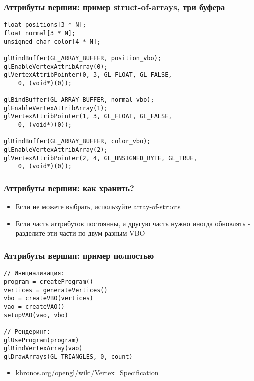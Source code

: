 \documentclass{beamer}
\begin{document}
\begin{frame}[fragile]
\frametitle{Аттрибуты вершин: пример struct-of-arrays, три буфера}
\fontsize{8pt}{8pt}
\begin{verbatim}
float positions[3 * N];
float normal[3 * N];
unsigned char color[4 * N];

glBindBuffer(GL_ARRAY_BUFFER, position_vbo);
glEnableVertexAttribArray(0);
glVertexAttribPointer(0, 3, GL_FLOAT, GL_FALSE,
    0, (void*)(0));

glBindBuffer(GL_ARRAY_BUFFER, normal_vbo);
glEnableVertexAttribArray(1);
glVertexAttribPointer(1, 3, GL_FLOAT, GL_FALSE,
    0, (void*)(0));

glBindBuffer(GL_ARRAY_BUFFER, color_vbo);
glEnableVertexAttribArray(2);
glVertexAttribPointer(2, 4, GL_UNSIGNED_BYTE, GL_TRUE,
    0, (void*)(0));
\end{verbatim}
\begin{center}
\end{center}
\end{frame}

\begin{frame}[fragile]
\frametitle{Аттрибуты вершин: как хранить?}
\begin{itemize}
\item Если не можете выбрать, используйте array-of-structs
\pause
\item Если часть аттрибутов постоянны, а другую часть нужно иногда обновлять - разделите эти части по двум разным VBO
\end{itemize}
\end{frame}

\begin{frame}[fragile]
\frametitle{Аттрибуты вершин: пример полностью}
\begin{verbatim}
// Инициализация:
program = createProgram()
vertices = generateVertices()
vbo = createVBO(vertices)
vao = createVAO()
setupVAO(vao, vbo)

// Рендеринг:
glUseProgram(program)
glBindVertexArray(vao)
glDrawArrays(GL_TRIANGLES, 0, count)
\end{verbatim}
\pause
\begin{itemize}
\item \href{https://www.khronos.org/opengl/wiki/Vertex_Specification}{khronos.org/opengl/wiki/Vertex\_Specification}
\end{itemize}
\end{frame}
\end{document}
